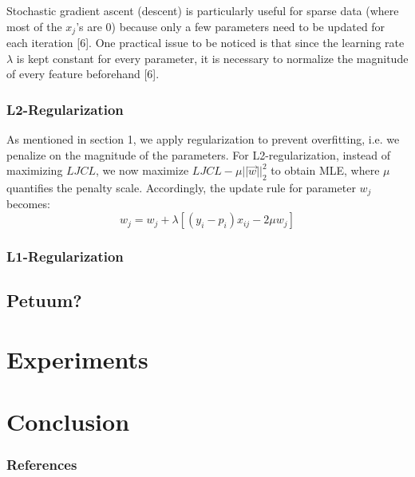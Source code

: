 \documentclass{article} %
\begin{document}
Stochastic gradient ascent (descent) is particularly useful for sparse data (where most of the $x_j$'s are 0) because only a few parameters need to be updated for each iteration [6]. One practical issue to be noticed is that since the learning rate $\lambda$ is kept constant for every parameter, it is necessary to normalize the magnitude of every feature beforehand [6].

\subsubsection{L2-Regularization}

As mentioned in section 1, we apply regularization to prevent overfitting, i.e. we penalize on the magnitude of the parameters. For L2-regularization, instead of maximizing $LJCL$, we now maximize $LJCL - \mu ||\vec{w}||_2^2$ to obtain MLE, where $\mu$ quantifies the penalty scale. Accordingly, the update rule for parameter $w_j$ becomes:
\begin{equation}
  w_j = w_j + \lambda [(y_i-p_i)x_{ij} - 2\mu w_j]
\end{equation}


\subsubsection{L1-Regularization}

\subsection{Petuum?}

\section{Experiments}
\label{others}

\section{Conclusion}


\subsubsection*{References}
\end{document}
